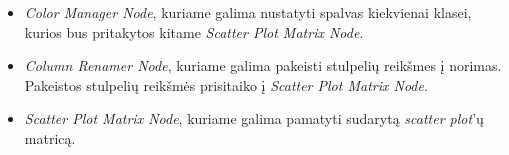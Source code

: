 \begin{itemize}
    \item \textit{Color Manager Node}, kuriame galima nustatyti spalvas kiekvienai klasei, kurios bus pritakytos kitame \textit{Scatter Plot Matrix Node}.
    \item \textit{Column Renamer Node}, kuriame galima pakeisti stulpelių reikšmes į norimas. Pakeistos stulpelių reikšmės prisitaiko į \textit{Scatter Plot Matrix Node}.
    \item \textit{Scatter Plot Matrix Node}, kuriame galima pamatyti sudarytą \textit{scatter plot}'ų matricą.
\end{itemize}